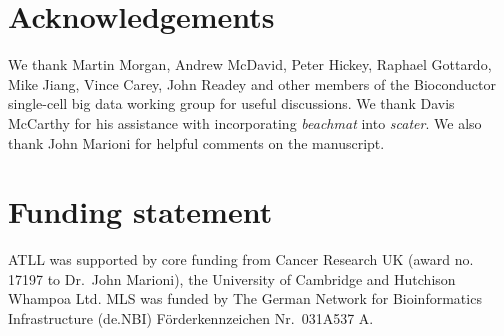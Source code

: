 \documentclass[10pt,letterpaper]{article}
\newcommand{\beachmat}{\textit{beachmat}}
\begin{document}
\section*{Acknowledgements}
We thank Martin Morgan, Andrew McDavid, Peter Hickey, Raphael Gottardo, Mike Jiang, Vince Carey, John Readey and other members of the Bioconductor single-cell big data working group for useful discussions.
We thank Davis McCarthy for his assistance with incorporating \beachmat{} into \textit{scater}.
We also thank John Marioni for helpful comments on the manuscript.

\section*{Funding statement}
ATLL was supported by core funding from Cancer Research UK (award no. 17197 to Dr.\ John Marioni), the University of Cambridge and Hutchison Whampoa Ltd.
MLS was funded by The German Network for Bioinformatics Infrastructure (de.NBI) F\"orderkennzeichen Nr.\ 031A537 A.


\end{document}
